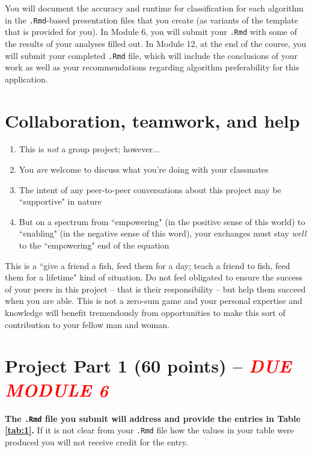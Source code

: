 \documentclass[11pt, oneside]{article}   	%
\begin{document}
\noindent  You will document the accuracy and runtime for classification for each algorithm in the \texttt{.Rmd}-based presentation files that you create (as variants of the template that is provided for you). In Module 6, you will submit your \texttt{.Rmd} with some of the results of your analyses filled out. In Module 12, at the end of the course, you will submit your completed \texttt{.Rmd} file, which will include the conclusions of your work as well as your recommendations regarding algorithm preferability for this application.  \\

\section{Collaboration, teamwork, and help}

\begin{enumerate}
\item This is \emph{not} a group project; however...
\item You \emph{are} welcome to discuss what you're doing with your classmates
\item The intent of any peer-to-peer conversations about this project may be ``supportive" in nature
\item But on a spectrum from ``empowering"  (in the positive sense of this world) to ``enabling" (in the negative sense of this word), your exchanges must stay \emph{well} to the  ``empowering"  end of the equation
\end{enumerate}

\noindent This is a ``give a friend a fish, feed them for a day; teach a friend to fish, feed them for a lifetime" kind of situation.  Do not feel obligated to ensure the success of your peers in this project -- that is their responsibility -- but help them succeed when you are able.   This is not a zero-sum game and your personal expertise and knowledge will benefit tremendously from opportunities to make this sort of contribution to your fellow man and woman. 

\section{Project Part 1 (60 points) -- \emph{\textcolor{red}{DUE MODULE 6}}}
\textbf{The \texttt{.Rmd} file you submit will address and provide the entries in Table \ref{tab:1}.}
If it is not clear from your \texttt{.Rmd} file how the values in your table were produced you will not receive credit for the entry. 
\end{document}

